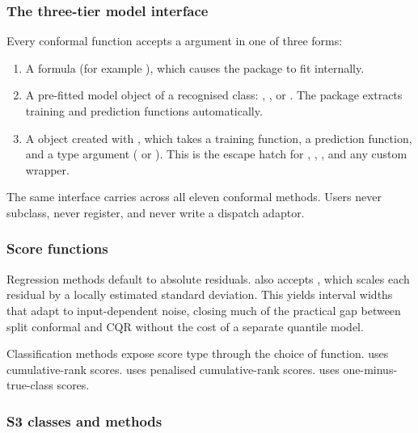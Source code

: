 \subsubsection{The three-tier model
interface}\label{the-three-tier-model-interface}

Every conformal function accepts a  argument in one of three
forms:

\begin{enumerate}
\def\labelenumi{\arabic{enumi}.}
\tightlist
\item
  A formula (for example ), which causes the package to
  fit  internally.
\item
  A pre-fitted model object of a recognised class: ,
  , or . The package extracts training and
  prediction functions automatically.
\item
  A  object created with ,
  which takes a training function, a prediction function, and a type
  argument ( or ). This is the
  escape hatch for , ,
  , and any custom wrapper.
\end{enumerate}

The same interface carries across all eleven conformal methods. Users
never subclass, never register, and never write a dispatch adaptor.

\subsubsection{Score functions}\label{score-functions}

Regression methods default to absolute residuals.
 also accepts
, which scales each residual by a
locally estimated standard deviation. This yields interval widths that
adapt to input-dependent noise, closing much of the practical gap
between split conformal and CQR without the cost of a separate quantile
model.

Classification methods expose score type through the choice of function.
 uses cumulative-rank scores.
 uses penalised cumulative-rank scores.
 uses one-minus-true-class scores.

\subsubsection{S3 classes and methods}\label{s3-classes-and-methods}

